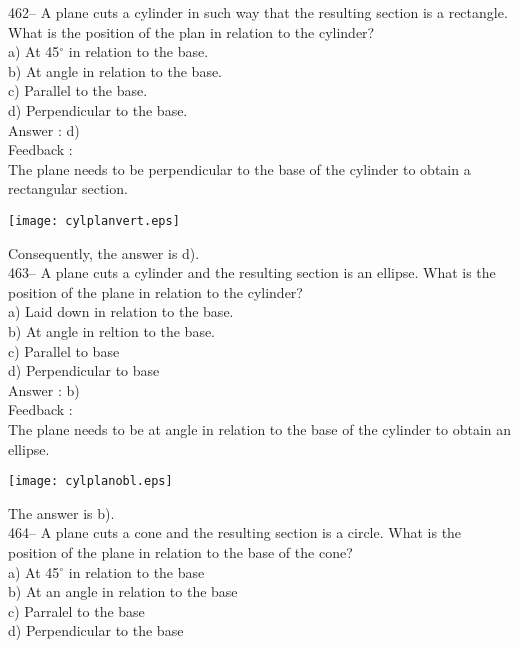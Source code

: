 ﻿\documentclass[letterpaper, 12pt]{article}
\begin{document}
462-- A plane cuts a cylinder in such way that the resulting section is a rectangle. What is the position of the plan in relation to the cylinder?\\
a) At 45$^{\circ}$ in relation to the base.\\
b) At angle in relation to the base.\\
c) Parallel to the base.\\
d) Perpendicular to the base.\\

Answer : d)\\

Feedback : \\
The plane needs to be perpendicular to the base of the cylinder to obtain a rectangular section.
    \begin{center}
    \texttt{[image: cylplanvert.eps]}
    \end{center}

Consequently, the answer is d).\\

463-- A plane cuts a cylinder and the resulting section is an ellipse. What is the position of the plane in relation to the cylinder?\\
a) Laid down in relation to the base.\\
b) At angle in reltion to the base.\\
c) Parallel to base\\
d) Perpendicular to base\\

Answer : b)\\

Feedback : \\
The plane needs to be at angle in relation to the base of the cylinder to obtain an ellipse.
    \begin{center}
    \texttt{[image: cylplanobl.eps]}
    \end{center}

The answer is b).\\


464-- A plane cuts a cone and the resulting section is a circle. What is the position of the plane in relation to the base of the cone?\\
a) At 45$^{\circ}$ in relation to the base\\
b) At an angle in relation to the base\\
c) Parralel to the base\\
d) Perpendicular to the base\\
\end{document}
